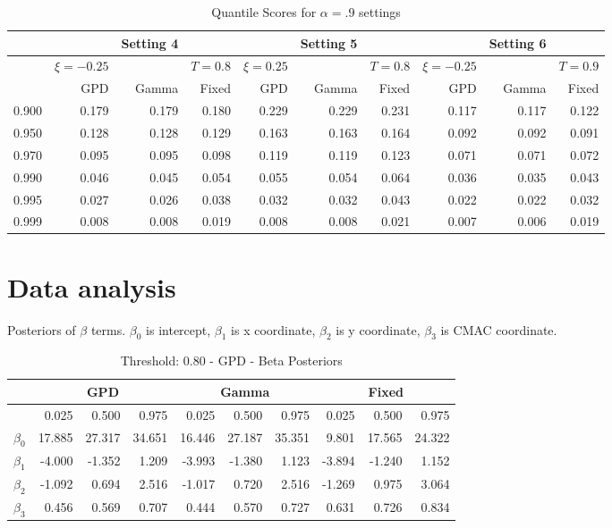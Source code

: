 \documentclass[11pt]{article}
\begin{document}
\begin{table}[htdp]
\caption{Quantile Scores for $\alpha=.9$ settings}
\begin{center}
\begin{tabular}{r|rrr|rrr|rrr|}
	\hline
	&&	Setting 4&	&	&Setting 5	&	&	&Setting 6	&	\\
	\hline
	&$\xi=-0.25$	&	&$T=0.8$& $\xi=0.25$ & & $T=0.8$& $\xi=-0.25$&&$T=0.9$\\
	\hline
	&GPD& Gamma & Fixed & GPD & Gamma & Fixed & GPD &Gamma & Fixed\\
	\hline
0.900	&	0.179	&	0.179	&	0.180	&	0.229	&	0.229	&	0.231	&	0.117	&	0.117	&	0.122\\
	\hline
0.950	&	0.128	&	0.128	&	0.129	&	0.163	&	0.163	&	0.164	&	0.092	&	0.092	&	0.091\\
	\hline
0.970	&	0.095	&	0.095	&	0.098	&	0.119	&	0.119	&	0.123	&	0.071	&	0.071	&	0.072\\
	\hline
0.990	&	0.046	&	0.045	&	0.054	&	0.055	&	0.054	&	0.064	&	0.036	&	0.035	&	0.043\\
	\hline
0.995	&	0.027	&	0.026	&	0.038	&	0.032	&	0.032	&	0.043	&	0.022	&	0.022	&	0.032\\
	\hline
0.999	&	0.008	&	0.008	&	0.019	&	0.008	&	0.008	&	0.021	&	0.007	&	0.006	&	0.019\\
	\hline
\end{tabular}
\end{center}
\label{lbl:quantsim9}
\end{table}%




\section{Data analysis}\label{s:analysis}
Posteriors of $\beta$ terms. $\beta_0$ is intercept, $\beta_1$ is x coordinate, $\beta_2$ is y coordinate, $\beta_3$ is CMAC coordinate.
\begin{table}[htdp]
\caption{Threshold: 0.80 - GPD - Beta Posteriors}
\begin{center}
\begin{tabular}{|c|rrr|rrr|rrr|}
	 &\multicolumn{3}{c|}{GPD}& \multicolumn{3}{c|}{Gamma}& \multicolumn{3}{c|}{Fixed}\\
	\hline
				& 0.025		&	0.500	&	0.975& 0.025		&	0.500	&	0.975& 0.025		&	0.500	&	0.975\\
	\hline
	\hline
	$\beta_0$	& 17.885	&	27.317	&	34.651 & 16.446	&	27.187	&	35.351& 9.801		&	17.565	&	24.322\\
	\hline
	$\beta_1$	& -4.000	&	-1.352	&	1.209& -3.993	&	-1.380	&	1.123& -3.894	&	-1.240	&	1.152\\
	\hline
	$\beta_2$	& -1.092	&	0.694	&	2.516& -1.017	&	0.720	&	2.516& -1.269	&	0.975	&	3.064\\
	\hline
	$\beta_3$	& 0.456		&	0.569	&	0.707& 0.444		&	0.570	&	0.727& 0.631		&	0.726	&	0.834\\
	\hline	
\end{tabular}
\end{center}
\label{lbl:beta80}
\end{table}%
\end{document}
